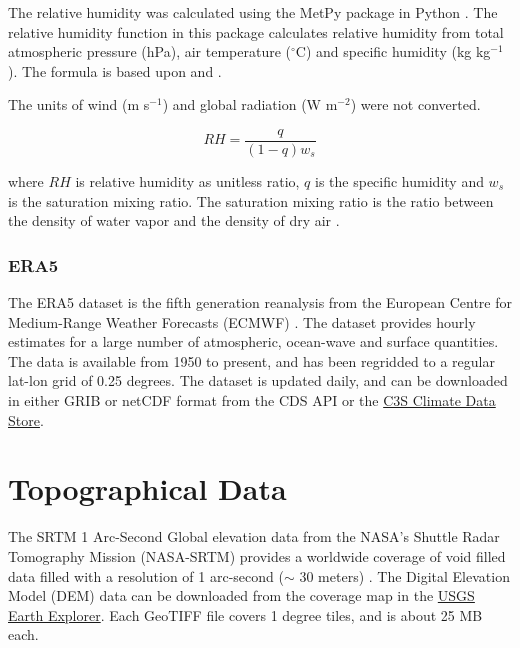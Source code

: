 The relative humidity was calculated using the MetPy package in Python \autocite{mayMetPyMeteorologicalPython2022}. The relative humidity function in this package calculates relative humidity from total atmospheric pressure (hPa), air temperature ($^{\circ}$C) and specific humidity (kg kg$^{-1}$). The formula is based upon \autocite{wallaceAtmosphericScienceIntroductory1977} and \autocite{salbyFundamentalsAtmosphericPhysics1996a}. 

The units of wind (m s$^{-1}$) and global radiation (W m$^{-2}$) were not converted. 

\begin{equation}
    RH = \frac{q}{(1 - q) w_{s}}
\end{equation}

where $RH$ is relative humidity as unitless ratio,  $q$ is the specific humidity and $w_{s}$ is the saturation mixing ratio. The saturation mixing ratio is the ratio between the density of water vapor and the density of dry air \autocite{kasaharaWeatherPredictionNumerical2003}. 


\subsubsection{ERA5}

The ERA5 dataset is the fifth generation reanalysis from the European Centre for Medium-Range Weather Forecasts (ECMWF) \autocite{hersbachERA5HourlyData2018}. The dataset provides hourly estimates for a large number of atmospheric, ocean-wave and surface quantities. The data is available from 1950 to present, and has been regridded to a regular lat-lon grid of 0.25 degrees. The dataset is updated daily, and can be downloaded in either GRIB or netCDF format from the CDS API or the \href{https://cds.climate.copernicus.eu/cdsapp#!/dataset/reanalysis-era5-single-levels?tab=overview}{C3S Climate Data Store}.

\section{Topographical Data}

The SRTM 1 Arc-Second Global elevation data from the NASA's Shuttle Radar Tomography Mission (NASA-SRTM) provides a worldwide coverage of void filled data filled with a resolution of 1 arc-second ($\sim$ 30 meters) \autocite{earthresourcesobservationandscienceeroscenterShuttleRadarTopography2017}. The Digital Elevation Model (DEM) data can be downloaded from the coverage map in the  \href{https://earthexplorer.usgs.gov/}{USGS Earth Explorer}. Each GeoTIFF file covers 1 degree tiles, and is about 25 MB each.

